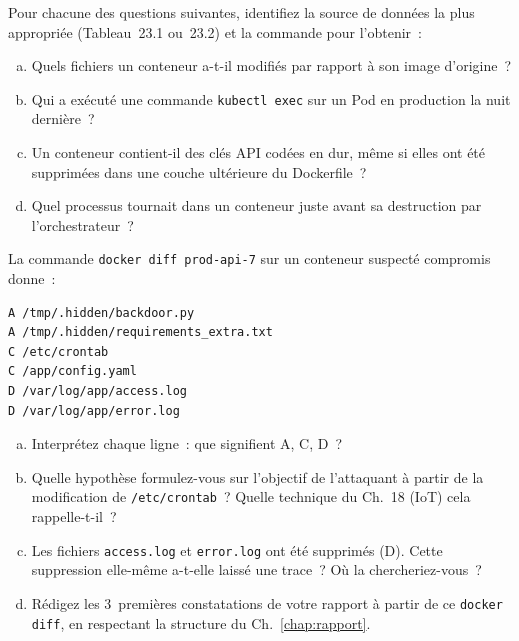 \begin{boxexo}[title={\ding{45}\quad Exercice~23.1 --- Identifier les sources \niveaubase}]
Pour chacune des questions suivantes, identifiez la source de
données la plus appropriée (Tableau~23.1 ou~23.2) et la commande
pour l'obtenir~:
\begin{enumerate}[(a)]
    \item Quels fichiers un conteneur a-t-il modifiés par rapport
          à son image d'origine~?
    \item Qui a exécuté une commande \texttt{kubectl exec} sur un
          Pod en production la nuit dernière~?
    \item Un conteneur contient-il des clés API codées en dur,
          même si elles ont été supprimées dans une couche
          ultérieure du Dockerfile~?
    \item Quel processus tournait dans un conteneur juste avant
          sa destruction par l'orchestrateur~?
\end{enumerate}
\end{boxexo}

\begin{boxexo}[title={\ding{45}\quad Exercice~23.2 --- Analyse de docker diff \niveaumoyen}]
La commande \texttt{docker diff prod-api-7} sur un conteneur
suspecté compromis donne~:
\begin{lstlisting}[language=bash_forensique]
A /tmp/.hidden/backdoor.py
A /tmp/.hidden/requirements_extra.txt
C /etc/crontab
C /app/config.yaml
D /var/log/app/access.log
D /var/log/app/error.log
\end{lstlisting}
\begin{enumerate}[(a)]
    \item Interprétez chaque ligne~: que signifient A, C, D~?
    \item Quelle hypothèse formulez-vous sur l'objectif de
          l'attaquant à partir de la modification de
          \texttt{/etc/crontab}~? Quelle technique du Ch.~18
          (IoT) cela rappelle-t-il~?
    \item Les fichiers \texttt{access.log} et \texttt{error.log}
          ont été supprimés (D). Cette suppression elle-même
          a-t-elle laissé une trace~? Où la chercheriez-vous~?
    \item Rédigez les 3~premières constatations de votre rapport
          à partir de ce \texttt{docker diff}, en respectant
          la structure du Ch.~\ref{chap:rapport}.
\end{enumerate}
\end{boxexo}

